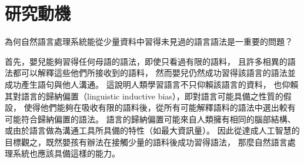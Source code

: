 \section{研究動機}

\iffalse
讓電腦理解人類語言，是幾乎所有從事人工智慧的研究者們最終的目標。
近年來，巨量資料與硬體資源的進步大幅推動了自然語言處理的發展。
1957年佛氏 （John Rupert Firth）\cite{Firth1957ASO}所提倡的分布假說（distributional hypothesis）：
``You shall know a word by the company it keeps''.
為基於分佈語義學（distributional semantics）的方法提供了理論基礎；
2014年米氏（Tomas Mikolov）提出的文字向量（word2vec）\cite{Mikolov2013DistributedRO}
到2018年彼氏\cite{peters-etal-2018-deep}與戴氏\cite{devlin-etal-2019-bert}先後提出的上下文化詞向量（contextualized word representations），
其訓練所使用的語料愈來愈龐雜，模型參數愈大，
於下游任務（downstream task）如詞性標注（part-of-speech tagging）、句法剖析（syntactic parsing）、語意角色標注（semantic role labeling）、問答系統（question answering）等的表現愈佳。

而巨量資料需要大模型的表現力（expressiveness）來加以建模，才有用武之地；
大模型的巨量參數則需要巨量資料才不致過擬合（overfitting）；兩者相輔相成，缺一不可。

但是只有少數常見語言如英文、中文等存在巨量資料供模型訓練，而這些語言僅佔地球上所有語言的5\%；
占比95\%的資料不足語言（low-resource languages）卻無法直接套用需要巨量資料的大參數模型而在下游任務中獲得與常見語言同樣的進步。
幸而語言儘管表面形式（surface form）不一，深層結構卻驚人地相似\cite{greenberg1963universals}，
因此出現許多研究致力於將多語言訓練（multilingual training）在其他資料充足語言（high-resource languages）上的模型轉移（transfer）到資料不足語言，
希望能藉助資料充足語言與資料不足語言的相似性，提高資料不足語言上的任務表現。
\fi

為何自然語言處理系統能從少量資料中習得未見過的語言語法是一重要的問題？

首先，嬰兒能夠習得任何母語的語法，即使只看過有限的語料，
且許多相異的語法都可以解釋這些他們所接收到的語料，
然而嬰兒仍然成功習得該語言的語法並成功產生語句與他人溝通。
這說明人類學習語言不只仰賴該語言的資料，
也仰賴其對語言的歸納偏置（linguistic inductive bias），即對語言可能具備之性質的假設，
使得他們能夠在吸收有限的語料後，從所有可能解釋語料的語法中選出較有可能符合歸納偏置的語法。
語言的歸納偏置可能來自人類擁有相同的腦部結構、或由於語言做為溝通工具所具備的特性（如最大資訊量）。
因此從達成人工智慧的目標觀之，既然嬰孩有辦法在接觸少量的語料後成功習得語法，
那麼自然語言處理系統也應該具備這樣的能力。

